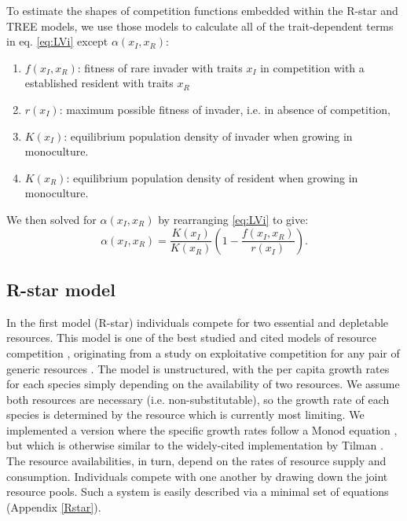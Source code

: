 \documentclass[a4paper,11pt]{article}
\newcommand{\Rstar}{\ensuremath{R^*}}
\begin{document}
To estimate the shapes of competition functions embedded within the R-star
and TREE models, we use those models to calculate all of the trait-dependent
terms in eq. \ref{eq:LVi} except $\alpha(x_I, x_R)$:
\begin{enumerate}
  \item $f(x_I, x_R)$: fitness of rare invader with traits $x_I$  in competition
  with a established resident with traits $x_R$
  \item $r(x_I)$: maximum possible fitness of invader, i.e. in absence of competition,
  \item $K(x_I)$: equilibrium population density of invader when growing in monoculture.
  \item $K(x_R)$: equilibrium population density of resident when growing in
  monoculture.
\end{enumerate}
We then solved for $\alpha(x_I, x_R)$ by rearranging  \ref{eq:LVi} to give:
\begin{equation}
  \label{eq:alpha}
 \alpha(x_I, x_R) = \frac{K(x_I)}{K(x_R)}
  \left(1 - \frac{f(x_I, x_R)}{r(x_I)}\right).
\end{equation}

\subsection{R-star model}


In the first model (R-star) individuals compete for two essential and
depletable resources. This model is one of the best studied and cited models
of resource competition \citep{Tilman-1977, Tilman-1982, Huisman-1999},
originating from a study on exploitative competition for any pair of generic
resources \citep{Leon-1975}. The model is unstructured, with the per capita
growth rates for each species simply depending on the availability of two
resources. We assume both resources are necessary (i.e. non-substitutable), so
the growth rate of each species is determined by the resource which is
currently most limiting. We implemented a version where the specific growth
rates follow a Monod equation \citet{Huisman-1999}, but which is otherwise
similar to the widely-cited implementation by Tilman \citep{Tilman-1977,
Tilman-1982}.  The resource availabilities, in turn, depend on the rates of
resource supply and consumption. Individuals compete with one another by
drawing down the joint resource pools. Such a system is easily described via a
minimal set of equations (Appendix \ref{Rstar}).
\end{document}
